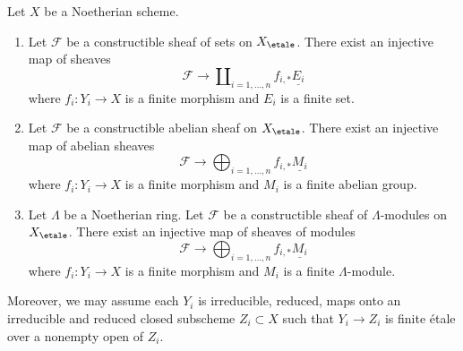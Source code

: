 \begin{lemma}
\label{lemma-constructible-maps-into-constant}
Let $X$ be a Noetherian scheme.
\begin{enumerate}
\item Let $\mathcal{F}$ be a constructible sheaf of sets on $X_\etale$.
There exist an injective map of sheaves
$$
\mathcal{F} \longrightarrow
\coprod\nolimits_{i = 1, \ldots, n} f_{i, *}\underline{E_i}
$$
where $f_i : Y_i \to X$ is a finite morphism and $E_i$ is a finite set.
\item Let $\mathcal{F}$ be a constructible abelian sheaf on $X_\etale$.
There exist an injective map of abelian sheaves
$$
\mathcal{F} \longrightarrow
\bigoplus\nolimits_{i = 1, \ldots, n} f_{i, *}\underline{M_i}
$$
where $f_i : Y_i \to X$ is a finite morphism and
$M_i$ is a finite abelian group.
\item Let $\Lambda$ be a Noetherian ring.
Let $\mathcal{F}$ be a constructible sheaf of $\Lambda$-modules on $X_\etale$.
There exist an injective map of sheaves of modules
$$
\mathcal{F} \longrightarrow
\bigoplus\nolimits_{i = 1, \ldots, n} f_{i, *}\underline{M_i}
$$
where $f_i : Y_i \to X$ is a finite morphism and
$M_i$ is a finite $\Lambda$-module.
\end{enumerate}
Moreover, we may assume each $Y_i$ is irreducible, reduced, maps onto
an irreducible and reduced closed subscheme $Z_i \subset X$ such that
$Y_i \to Z_i$ is finite \'etale over a nonempty open of $Z_i$.
\end{lemma}

